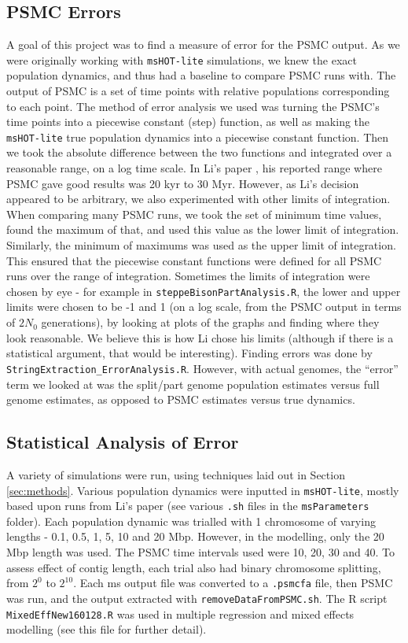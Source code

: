 \documentclass[11pt,a4paper]{article}
\begin{document}
\subsection{PSMC Errors}
A goal of this project was to find a measure of error for the PSMC output. As we were originally working with \verb|msHOT-lite| simulations, we knew the exact population dynamics, and thus had a baseline to compare PSMC runs with. The output of PSMC is a set of time points with relative populations corresponding to each point. The method of error analysis we used was turning the PSMC's time points into a piecewise constant (step) function, as well as making the \verb|msHOT-lite| true population dynamics into a piecewise constant function. Then we took the absolute difference between the two functions and integrated over a reasonable range, on a log time scale. In Li's paper \cite{li2011inference}, his reported range where PSMC gave good results was 20 kyr to 30 Myr. However, as Li's decision appeared to be arbitrary, we also experimented with other limits of integration. When comparing many PSMC runs, we took the set of minimum time values, found the maximum of that, and used this value as the lower limit of integration. Similarly, the minimum of maximums was used as the upper limit of integration. This ensured that the piecewise constant functions were defined for all PSMC runs over the range of integration. Sometimes the limits of integration were chosen by eye - for example in \verb|steppeBisonPartAnalysis.R|, the lower and upper limits were chosen to be -1 and 1 (on a log scale, from the PSMC output in terms of $2N_0$ generations), by looking at plots of the graphs and finding where they look reasonable. We believe this is how Li chose his limits (although if there is a statistical argument, that would be interesting). Finding errors was done by \verb|StringExtraction_ErrorAnalysis.R|. However, with actual genomes, the ``error'' term we looked at was the split/part genome population estimates versus full genome estimates, as opposed to PSMC estimates versus true dynamics.

\subsection{Statistical Analysis of Error}
A variety of simulations were run, using techniques laid out in Section \ref{sec:methods}. Various population dynamics were inputted in \verb|msHOT-lite|, mostly based upon runs from Li's paper \cite{li2011inference} (see various \verb|.sh| files in the \verb|msParameters| folder). Each population dynamic was trialled with 1 chromosome of varying lengths - 0.1, 0.5, 1, 5, 10 and 20 Mbp. However, in the modelling, only the 20 Mbp length was used. The PSMC time intervals used were 10, 20, 30 and 40. To assess effect of contig length, each trial also had binary chromosome splitting, from $2^0$ to $2^{10}$. Each ms output file was converted to a \verb|.psmcfa| file, then PSMC was run, and the output extracted with \verb|removeDataFromPSMC.sh|. The R script \verb|MixedEffNew160128.R| was used in multiple regression and mixed effects modelling (see this file for further detail).
\end{document}
